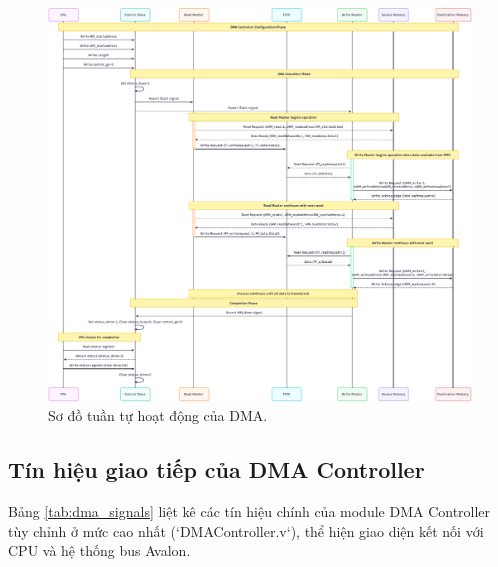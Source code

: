 \begin{figure}[htbp]
    \centering
    \includegraphics[width=\linewidth]{Images/02_10_SystemSequenceDiagram}
    \caption{Sơ đồ tuần tự hoạt động của DMA.}
    \label{fig:dma_flowchart_pdf}
\end{figure}

\subsection{Tín hiệu giao tiếp của DMA Controller} %
Bảng \ref{tab:dma_signals} liệt kê các tín hiệu chính của module DMA Controller tùy chỉnh ở mức cao nhất (`DMAController.v`), thể hiện giao diện kết nối với CPU và hệ thống bus Avalon.

